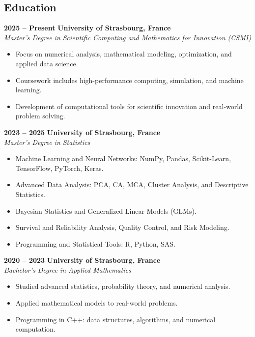 \documentclass[lighthipster]{simplehipstercv}
\begin{document}
\begin{paracol}{2}
\vspace{-0.5em}


\section*{Education}

\textbf{2025 -- Present} \hfill \textbf{University of Strasbourg, France}\\
\textit{Master’s Degree in Scientific Computing and Mathematics for Innovation (CSMI)}
\begin{itemize}[leftmargin=2em, itemsep=0.2em, topsep=0em]
    \item Focus on numerical analysis, mathematical modeling, optimization, and applied data science.
    \item Coursework includes high-performance computing, simulation, and machine learning.
    \item Development of computational tools for scientific innovation and real-world problem solving.
\end{itemize}

\textbf{2023 -- 2025} \hfill \textbf{University of Strasbourg, France}\\
\textit{Master’s Degree in Statistics}
\begin{itemize}[leftmargin=2em, itemsep=0.2em, topsep=0em]
    \item Machine Learning and Neural Networks: NumPy, Pandas, Scikit-Learn, TensorFlow, PyTorch, Keras.
    \item Advanced Data Analysis: PCA, CA, MCA, Cluster Analysis, and Descriptive Statistics.
    \item Bayesian Statistics and Generalized Linear Models (GLMs).
    \item Survival and Reliability Analysis, Quality Control, and Risk Modeling.
    \item Programming and Statistical Tools: R, Python, SAS.
\end{itemize}

\textbf{2020 -- 2023} \hfill \textbf{University of Strasbourg, France}\\
\textit{Bachelor’s Degree in Applied Mathematics}
\begin{itemize}[leftmargin=2em, itemsep=0.2em, topsep=0em]
    \item Studied advanced statistics, probability theory, and numerical analysis.
    \item Applied mathematical models to real-world problems.
    \item Programming in C++: data structures, algorithms, and numerical computation.
\end{itemize}


\end{paracol}
\end{document}
